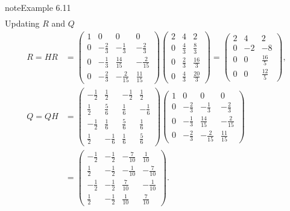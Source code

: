 \documentclass[letterpaper,10pt,english]{jupyterBook}
\begin{document}
\begin{sphinxadmonition}{note}{Example 6.11}
\begin{align*}
\end{align*}
\sphinxAtStartPar
Updating \(R\) and \(Q\)
\begin{align*}
    R = H R & = \left(\begin{matrix}1 & 0 & 0 & 0\\0 & - \frac{2}{3} & - \frac{1}{3} & - \frac{2}{3}\\0 & - \frac{1}{3} & \frac{14}{15} & - \frac{2}{15}\\0 & - \frac{2}{3} & - \frac{2}{15} & \frac{11}{15}\end{matrix}\right)\left(\begin{matrix}2 & 4 & 2\\0 & \frac{4}{3} & \frac{8}{3}\\0 & \frac{2}{3} & \frac{16}{3}\\0 & \frac{4}{3} & \frac{20}{3}\end{matrix}\right) = \left(\begin{matrix}2 & 4 & 2\\0 & -2 & -8\\0 & 0 & \frac{16}{5}\\0 & 0 & \frac{12}{5}\end{matrix}\right), \\
    Q = Q H &= \left(\begin{matrix}- \frac{1}{2} & \frac{1}{2} & - \frac{1}{2} & \frac{1}{2}\\\frac{1}{2} & \frac{5}{6} & \frac{1}{6} & - \frac{1}{6}\\- \frac{1}{2} & \frac{1}{6} & \frac{5}{6} & \frac{1}{6}\\\frac{1}{2} & - \frac{1}{6} & \frac{1}{6} & \frac{5}{6}\end{matrix}\right)\left(\begin{matrix}1 & 0 & 0 & 0\\0 & - \frac{2}{3} & - \frac{1}{3} & - \frac{2}{3}\\0 & - \frac{1}{3} & \frac{14}{15} & - \frac{2}{15}\\0 & - \frac{2}{3} & - \frac{2}{15} & \frac{11}{15}\end{matrix}\right) \\
    &= \left(\begin{matrix}- \frac{1}{2} & - \frac{1}{2} & - \frac{7}{10} & \frac{1}{10}\\\frac{1}{2} & - \frac{1}{2} & - \frac{1}{10} & - \frac{7}{10}\\- \frac{1}{2} & - \frac{1}{2} & \frac{7}{10} & - \frac{1}{10}\\\frac{1}{2} & - \frac{1}{2} & \frac{1}{10} & \frac{7}{10}\end{matrix}\right).

\end{align*}
\end{sphinxadmonition}
\end{document}
